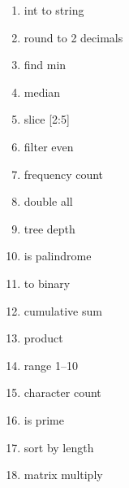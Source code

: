 \documentclass[11pt]{article}
\theoremstyle{definition}
\begin{document}
\begin{enumerate}[nosep]
 any negative \item int to string \item round to 2 decimals \item find min \item median \item slice [2:5] \item filter even \item frequency count \item double all \item tree depth \item is palindrome \item to binary \item cumulative sum \item product \item range 1--10 \item character count \item is prime \item sort by length \item matrix multiply
\end{enumerate}
\end{document}
